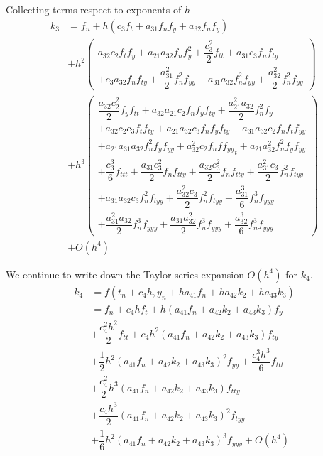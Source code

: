 \documentclass[a4paper,oneside]{book}
\numberwithin{equation}{chapter}
\begin{document}
Collecting terms respect to exponents of $h$
\begin{align}
{k_3} &= {f_n} + h\left( {{c_3}{f_t} + {a_{31}}{f_n}{f_y} + {a_{32}}{f_n}{f_y}} \right)\\
 &+ {h^2}\left( \begin{array}{l}
{a_{32}}{c_2}{f_t}{f_y} + {a_{21}}{a_{32}}{f_n}f_y^2 + \dfrac{{c_3^2}}{2}{f_{tt}} + {a_{31}}{c_3}{f_n}{f_{ty}}\\
 + {c_3}{a_{32}}{f_n}{f_{ty}} + \dfrac{{a_{31}^2}}{2}f_n^2{f_{yy}} + {a_{31}}{a_{32}}f_n^2{f_{yy}} + \dfrac{{a_{32}^2}}{2}f_n^2{f_{yy}}
\end{array} \right)\\
 &+ {h^3}\left( \begin{array}{l}
\dfrac{{{a_{32}}c_2^2}}{2}{f_y}{f_{tt}} + {a_{32}}{a_{21}}{c_2}{f_n}{f_y}{f_{ty}} + \dfrac{{a_{21}^2{a_{32}}}}{2}f_n^2{f_y}\\
 + {a_{32}}{c_2}{c_3}{f_t}{f_{ty}} + {a_{21}}{a_{32}}{c_3}{f_n}{f_y}{f_{ty}} + {a_{31}}{a_{32}}{c_2}{f_n}{f_t}{f_{yy}}\\
 + {a_{21}}{a_{31}}{a_{32}}f_n^2{f_y}{f_{yy}} + a_{32}^2{c_2}{f_n}f{f_{yy}}_t + {a_{21}}a_{32}^2f_n^2{f_y}{f_{yy}}\\
 + \dfrac{{c_3^3}}{6}{f_{ttt}} + \dfrac{{{a_{31}}c_3^2}}{2}{f_n}{f_{tty}} + \dfrac{{{a_{32}}c_3^2}}{2}{f_n}{f_{tty}} + \dfrac{{a_{31}^2{c_3}}}{2}f_n^2{f_{tyy}}\\
 + {a_{31}}{a_{32}}{c_3}f_n^2{f_{tyy}} + \dfrac{{a_{32}^2{c_3}}}{2}f_n^2{f_{tyy}} + \dfrac{{a_{31}^3}}{6}f_n^3{f_{yyy}}\\
 + \dfrac{{a_{31}^2{a_{32}}}}{2}f_n^3{f_{yyy}} + \dfrac{{{a_{31}}a_{32}^2}}{2}f_n^3{f_{yyy}} + \dfrac{{a_{32}^3}}{6}f_n^3{f_{yyy}}
\end{array} \right)\\
 &+ O\left( {{h^4}} \right)
 \label{4.27}
\end{align}

We continue to write down the Taylor series expansion $O\left(h^4\right)$ for $k_4$.
\begin{align}
{k_4} &= f\left( {{t_n} + {c_4}h,{y_n} + h{a_{41}}{f_n} + h{a_{42}}{k_2} + h{a_{43}}{k_3}} \right)\\
 &= {f_n} + {c_4}h{f_t} + h\left( {{a_{41}}{f_n} + {a_{42}}{k_2} + {a_{43}}{k_3}} \right){f_y}\\
 &+ \dfrac{{c_4^2{h^2}}}{2}{f_{tt}} + {c_4}{h^2}\left( {{a_{41}}{f_n} + {a_{42}}{k_2} + {a_{43}}{k_3}} \right){f_{ty}}\\
 &+ \dfrac{1}{2}{h^2}{\left( {{a_{41}}{f_n} + {a_{42}}{k_2} + {a_{43}}{k_3}} \right)^2}{f_{yy}} + \dfrac{{c_4^3{h^3}}}{6}{f_{ttt}}\\
 &+ \dfrac{{c_4^2}}{2}{h^3}\left( {{a_{41}}{f_n} + {a_{42}}{k_2} + {a_{43}}{k_3}} \right){f_{tty}}\\
 &+ \dfrac{{{c_4}{h^3}}}{2}{\left( {{a_{41}}{f_n} + {a_{42}}{k_2} + {a_{43}}{k_3}} \right)^2}{f_{tyy}}\\
 &+ \dfrac{1}{6}{h^2}{\left( {{a_{41}}{f_n} + {a_{42}}{k_2} + {a_{43}}{k_3}} \right)^3}{f_{yyy}} + O\left( {{h^4}} \right)
 \label{4.34}
\end{align}
\end{document}
